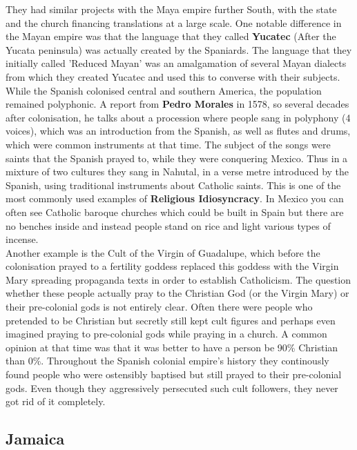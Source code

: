 \documentclass{article}
\begin{document}
	They had similar projects with the Maya empire further South, with the state and the church financing translations at a large scale. One notable difference in the Mayan empire was that the language that they called \textbf{Yucatec} (After the Yucata peninsula) was actually created by the Spaniards. The language that they initially called 'Reduced Mayan' was an amalgamation of several Mayan dialects from which they created Yucatec and used this to converse with their subjects. \\
	While the Spanish colonised central and southern America, the population remained polyphonic. A report from \textbf{Pedro Morales} in 1578, so several decades after colonisation, he talks about a procession where people sang in polyphony (4 voices), which was an introduction from the Spanish, as well as flutes and drums, which were common instruments at that time. The subject of the songs were saints that the Spanish prayed to, while they were conquering Mexico. Thus in a mixture of two cultures they sang in Nahutal, in a verse metre introduced by the Spanish, using traditional instruments about Catholic saints. This is one of the most commonly used examples of \textbf{Religious Idiosyncracy}. In Mexico you can often see Catholic baroque churches which could be built in Spain but there are no benches inside and instead people stand on rice and light various types of incense. \\
	Another example is the Cult of the Virgin of Guadalupe, which before the colonisation prayed to a fertility goddess replaced this goddess with the Virgin Mary spreading propaganda texts in order to establish Catholicism. The question whether these people actually pray to the Christian God (or the Virgin Mary) or their pre-colonial gods is not entirely clear. Often there were people who pretended to be Christian but secretly still kept cult figures and perhaps even imagined praying to pre-colonial gods while praying in a church. A common opinion at that time was that it was better to have a person be 90\% Christian than 0\%. Throughout the Spanish colonial empire's history they continously found people who were ostensibly baptised but still prayed to their pre-colonial gods. Even though they aggressively persecuted such cult followers, they never got rid of it completely. \\
	\subsection{Jamaica}
\end{document}
